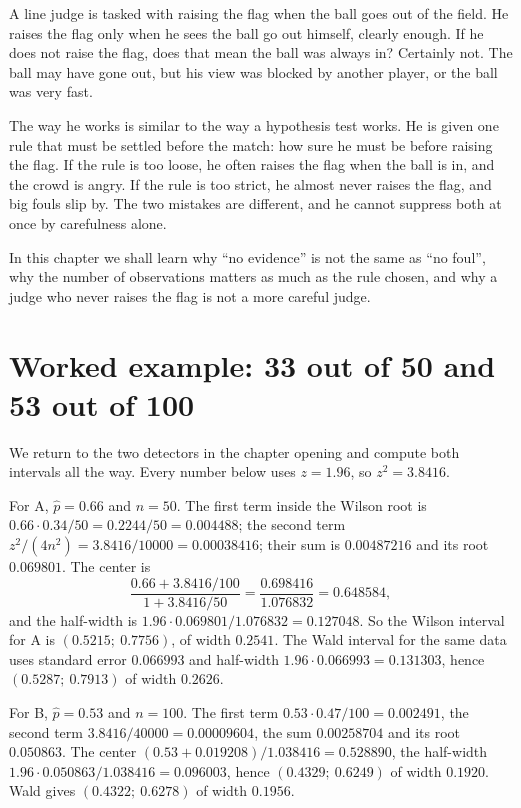 \begin{untukanak}
A line judge is tasked with raising the flag when the ball goes out of the field. He raises the
flag only when he sees the ball go out himself, clearly enough. If he does not raise the flag,
does that mean the ball was always in? Certainly not. The ball may have gone out, but his view
was blocked by another player, or the ball was very fast.

The way he works is similar to the way a hypothesis test works. He is given one rule that must
be settled before the match: how sure he must be before raising the flag. If the rule is too
loose, he often raises the flag when the ball is in, and the crowd is angry. If the rule is too
strict, he almost never raises the flag, and big fouls slip by. The two mistakes are
different, and he cannot suppress both at once by carefulness alone.

In this chapter we shall learn why ``no evidence'' is not the same as ``no foul'', why the
number of observations matters as much as the rule chosen, and why a judge who never raises
the flag is not a more careful judge.
\end{untukanak}

\section{Worked example: 33 out of 50 and 53 out of 100}

We return to the two detectors in the chapter opening and compute both intervals all the way.
Every number below uses $z=1.96$, so $z^2=3.8416$.

For A, $\hat p=0.66$ and $n=50$. The first term inside the Wilson root is
$0.66\cdot0.34/50=0.2244/50=0.004488$; the second term
$z^2/(4n^2)=3.8416/10000=0.00038416$; their sum is $0.00487216$ and its root
$0.069801$. The center is
\[
\frac{0.66+3.8416/100}{1+3.8416/50}
=\frac{0.698416}{1.076832}=0.648584,
\]
and the half-width is $1.96\cdot0.069801/1.076832=0.127048$. So the Wilson interval
for A is $(0.5215;\ 0.7756)$, of width $0.2541$. The Wald interval for the
same data uses standard error $0.066993$ and half-width
$1.96\cdot0.066993=0.131303$, hence $(0.5287;\ 0.7913)$ of width
$0.2626$.

For B, $\hat p=0.53$ and $n=100$. The first term
$0.53\cdot0.47/100=0.002491$, the second term $3.8416/40000=0.00009604$,
the sum $0.00258704$ and its root $0.050863$. The center
$(0.53+0.019208)/1.038416=0.528890$, the half-width
$1.96\cdot0.050863/1.038416=0.096003$, hence $(0.4329;\ 0.6249)$ of width
$0.1920$. Wald gives $(0.4322;\ 0.6278)$ of width $0.1956$.

